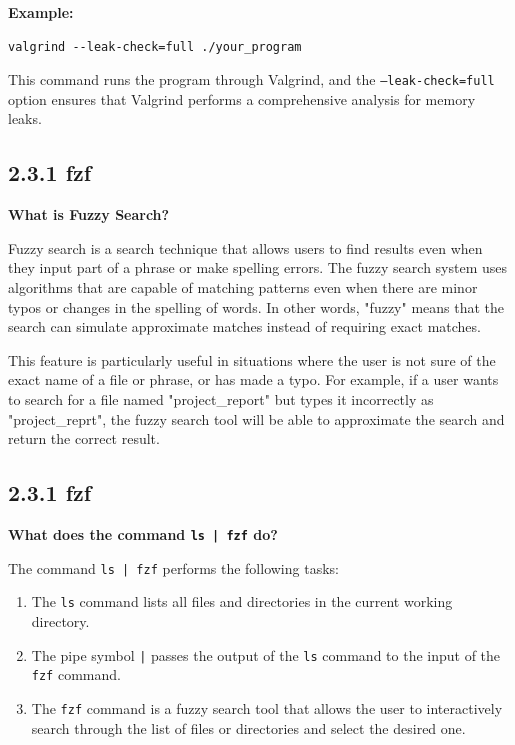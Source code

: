 \documentclass{article}
\begin{document}
\textbf{Example:}
\begin{verbatim}
valgrind --leak-check=full ./your_program
\end{verbatim}
This command runs the program through Valgrind, and the \texttt{--leak-check=full} option ensures that Valgrind performs a comprehensive analysis for memory leaks.






\subsection*{2.3.1 fzf}

\textbf{What is Fuzzy Search?}

Fuzzy search is a search technique that allows users to find results even when they input part of a phrase or make spelling errors. The fuzzy search system uses algorithms that are capable of matching patterns even when there are minor typos or changes in the spelling of words. In other words, "fuzzy" means that the search can simulate approximate matches instead of requiring exact matches.

This feature is particularly useful in situations where the user is not sure of the exact name of a file or phrase, or has made a typo. For example, if a user wants to search for a file named "project\_report" but types it incorrectly as "project\_reprt", the fuzzy search tool will be able to approximate the search and return the correct result.







\subsection*{2.3.1 fzf}

\textbf{What does the command \texttt{ls | fzf} do?}

The command \texttt{ls | fzf} performs the following tasks:

\begin{enumerate}
    \item The \texttt{ls} command lists all files and directories in the current working directory.
    \item The pipe symbol \texttt{|} passes the output of the \texttt{ls} command to the input of the \texttt{fzf} command.
    \item The \texttt{fzf} command is a fuzzy search tool that allows the user to interactively search through the list of files or directories and select the desired one.
\end{enumerate}
\end{document}
